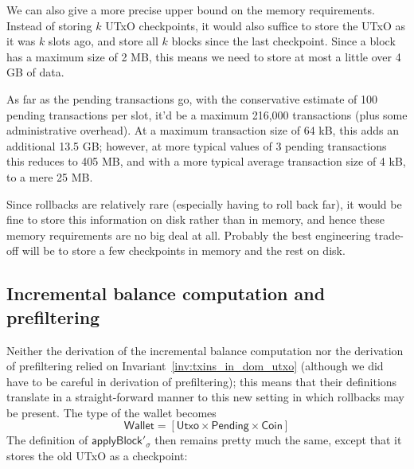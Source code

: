 \documentclass{article}
\begin{document}

We can also give a more precise upper bound on the memory requirements. Instead
of storing $k$ UTxO checkpoints, it would also suffice to store the UTxO as it
was $k$ slots ago, and store all $k$ blocks since the last checkpoint. Since a
block has a maximum size of 2 MB, this means we need to store at most a little
over 4 GB of data.

As far as the pending transactions go, with the conservative estimate of 100
pending transactions per slot, it'd be a maximum 216,000 transactions (plus some
administrative overhead). At a maximum transaction size of 64 kB, this adds an
additional 13.5 GB; however, at more typical values of 3 pending transactions
this reduces to 405 MB, and with a more typical average transaction size of 4
kB, to a mere 25 MB.

Since rollbacks are relatively rare (especially having to roll back far), it
would be fine to store this information on disk rather than in memory, and hence
these memory requirements are no big deal at all. Probably the best engineering
trade-off will be to store a few checkpoints in memory and the rest on disk.


\subsection{Incremental balance computation and prefiltering}

Neither the derivation of the incremental balance computation nor the derivation
of prefiltering relied on Invariant~\ref{inv:txins_in_dom_utxo} (although we did
have to be careful in derivation of prefiltering); this means that their
definitions translate in a straight-forward manner to this new setting in which
rollbacks may be present. The type of the wallet becomes
%
\begin{equation*}
\mathsf{Wallet} = [\mathsf{Utxo} \times \mathsf{Pending} \times \mathsf{Coin}]
\end{equation*}
%
The definition of $\mathsf{applyBlock}'_\sigma$ then remains pretty much the
same, except that it stores the old UTxO as a checkpoint:
\end{document}
